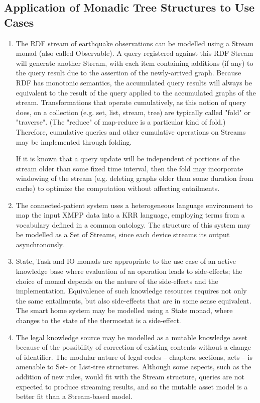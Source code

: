 \documentclass[runningheads]{llncs}
\begin{document}
\subsection{Application of Monadic Tree Structures to Use Cases}
\begin{enumerate}
\item The RDF stream of earthquake observations can be modelled using a Stream monad (also called Observable).
A query registered against this RDF Stream will generate another Stream, with each item containing additions (if any) to the query result due to the assertion of the newly-arrived graph.
Because RDF has monotonic semantics, the accumulated query results will always be equivalent to the result of the query applied to the accumulated graphs of the stream.
Transformations that operate cumulatively, as this notion of query does, on a collection (e.g. set, list, stream, tree) are typically called "fold" or "traverse". (The "reduce" of map-reduce is a particular kind of fold.)
Therefore, cumulative queries and other cumulative operations on Streams may be implemented through folding.

If it is known that a query update will be independent of portions of the stream older than some fixed time interval, then
the fold may incorporate windowing of the stream (e.g. deleting graphs older than some duration from cache) to optimize the computation without affecting entailments.

\item The connected-patient system uses a heterogeneous language environment to map the input XMPP data into a KRR language, employing terms from a vocabulary defined in a common ontology. The structure of this system may be modelled as a Set of Streams, since each device streams its output asynchronously.

\item State, Task and IO monads are appropriate to the use case of an active knowledge base where evaluation of an operation leads to side-effects; the choice of monad depends on the nature of the side-effects and the implementation.
Equivalence of such knowledge resources requires not only the same entailments, but also side-effects that are in some sense equivalent.
The smart home system may be modelled using a State monad, where changes to the state of the thermostat is a side-effect.

\item The legal knowledge source may be modelled as a mutable knowledge asset  because of the possibility of correction of existing contents without a change of identifier. The modular nature of legal codes -- chapters, sections, acts -- is amenable to Set- or List-tree structures. Although some aspects, such as the addition of new rules, would fit with the Stream structure, queries are not expected to produce streaming results, and so the mutable asset model is a better fit than a Stream-based model.


\end{enumerate}
\end{document}
